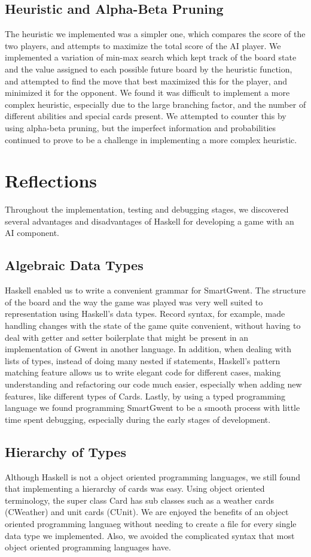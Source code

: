 \documentclass[numbers]{sigplanconf}
\begin{document}
\subsection{Heuristic and Alpha-Beta Pruning}
The heuristic we implemented was a simpler one, which compares the score of the two players, and attempts to maximize the total score of the AI player. We implemented a variation of min-max search  which kept track of the board state and the value assigned to each possible future board by the heuristic function, and attempted to find the move that best maximized this for the player, and minimized it for the opponent. We found it was difficult to implement a more complex heuristic, especially due to the large branching factor, and the number of different abilities and special cards present. We attempted to counter this by using alpha-beta pruning, but the imperfect information and probabilities continued to prove to be a challenge in implementing a more complex heuristic.

\section{Reflections}
Throughout the implementation, testing and debugging stages, we discovered several advantages and disadvantages of Haskell for developing a game with an AI component. 


\subsection{Algebraic Data Types}
Haskell enabled us to write a convenient grammar for SmartGwent. The structure of the board and the way the game was played was very well suited to representation using Haskell's data types. Record syntax, for example, made handling changes with the state of the game quite convenient, without having to deal with getter and setter boilerplate that might be present in an implementation of Gwent in another language. In addition, when dealing with lists of types, instead of doing many nested if statements, Haskell's pattern matching feature allows us to write elegant code for different cases, making understanding and refactoring our code much easier, especially when adding new features, like different types of Cards. Lastly, by using a typed programming language we found programming SmartGwent to be a smooth process with little time spent debugging, especially during the early stages of development.

\subsection{Hierarchy of Types}
Although Haskell is not a object oriented programming languages, we still found that implementing a hierarchy of cards was easy. Using object oriented terminology, the super class Card has sub classes such as a weather cards (CWeather) and unit cards (CUnit). We are enjoyed the benefits of an object oriented programming languaeg without needing to create a file for every single data type we implemented. Also, we avoided the complicated syntax that most object oriented programming languages have.
\end{document}
